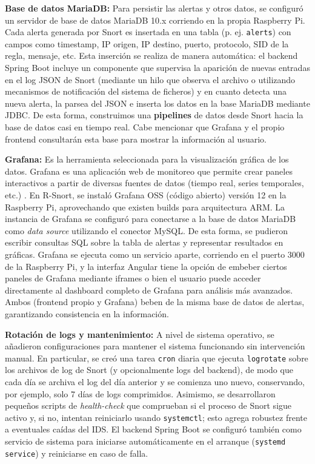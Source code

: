 \documentclass[11pt,a4paper,twoside]{report}
\begin{document}
\textbf{Base de datos MariaDB:} Para persistir las alertas y otros datos, se configuró un servidor de base de datos MariaDB 10.x corriendo en la propia Raspberry Pi. Cada alerta generada por Snort es insertada en una tabla (p. ej. \texttt{alerts}) con campos como timestamp, IP origen, IP destino, puerto, protocolo, SID de la regla, mensaje, etc. Esta inserción se realiza de manera automática: el backend Spring Boot incluye un componente que supervisa la aparición de nuevas entradas en el log JSON de Snort (mediante un hilo que observa el archivo o utilizando mecanismos de notificación del sistema de ficheros) y en cuanto detecta una nueva alerta, la parsea del JSON e inserta los datos en la base MariaDB mediante JDBC. De esta forma, construimos una \textbf{pipelines} de datos desde Snort hacia la base de datos casi en tiempo real. Cabe mencionar que Grafana y el propio frontend consultarán esta base para mostrar la información al usuario.\newline

\textbf{Grafana:} Es la herramienta seleccionada para la visualización gráfica de los datos. Grafana es una aplicación web de monitoreo que permite crear paneles interactivos a partir de diversas fuentes de datos (tiempo real, series temporales, etc.) \cite{Grafana}. En R-Snort, se instaló Grafana OSS (código abierto) versión 12 en la Raspberry Pi, aprovechando que existen builds para arquitectura ARM. La instancia de Grafana se configuró para conectarse a la base de datos MariaDB como \emph{data source} utilizando el conector MySQL. De esta forma, se pudieron escribir consultas SQL sobre la tabla de alertas y representar resultados en gráficas. Grafana se ejecuta como un servicio aparte, corriendo en el puerto 3000 de la Raspberry Pi, y la interfaz Angular tiene la opción de embeber ciertos paneles de Grafana mediante iframes o bien el usuario puede acceder directamente al dashboard completo de Grafana para análisis más avanzados. Ambos (frontend propio y Grafana) beben de la misma base de datos de alertas, garantizando consistencia en la información.\newline

\textbf{Rotación de logs y mantenimiento:} A nivel de sistema operativo, se añadieron configuraciones para mantener el sistema funcionando sin intervención manual. En particular, se creó una tarea \texttt{cron} diaria que ejecuta \texttt{logrotate} sobre los archivos de log de Snort (y opcionalmente logs del backend), de modo que cada día se archiva el log del día anterior y se comienza uno nuevo, conservando, por ejemplo, solo 7 días de logs comprimidos. Asimismo, se desarrollaron pequeños scripts de \emph{health-check} que comprueban si el proceso de Snort sigue activo y, si no, intentan reiniciarlo usando \texttt{systemctl}; esto agrega robustez frente a eventuales caídas del IDS. El backend Spring Boot se configuró también como servicio de sistema para iniciarse automáticamente en el arranque (\texttt{systemd service}) y reiniciarse en caso de falla.\newline
\end{document}

